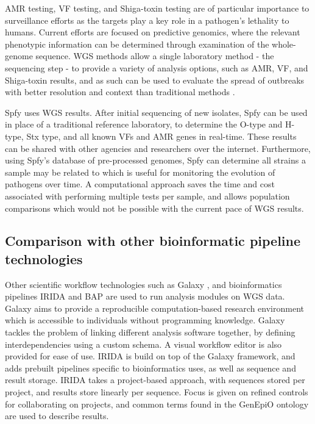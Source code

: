 \documentclass[a4,center,fleqn]{NAR}
\begin{document}
AMR testing, VF testing, and Shiga-toxin testing are of particular importance to surveillance efforts as the targets play a key role in a pathogen's lethality to humans.
Current efforts are focused on predictive genomics, where the relevant phenotypic information can be determined through examination of the whole-genome sequence.
WGS methods allow a single laboratory method - the sequencing step - to provide a variety of analysis options, such as AMR, VF, and Shiga-toxin results, and as such can be used to evaluate the spread of outbreaks with better resolution and context than traditional methods \cite{ronholm2016navigating}.

Spfy uses WGS results.
After initial sequencing of new isolates, Spfy can be used in place of a traditional reference laboratory, to determine the O-type and H-type, Stx type, and all known VFs and AMR genes in real-time.
These results can be shared with other agencies and researchers over the internet.
Furthermore, using Spfy's database of pre-processed genomes, Spfy can determine all strains a sample may be related to which is useful for monitoring the evolution of pathogens over time.
A computational approach saves the time and cost associated with performing multiple tests per sample, and allows population comparisons which would not be possible with the current pace of WGS results.

\subsection{Comparison with other bioinformatic pipeline technologies}

Other scientific workflow technologies such as Galaxy \cite{goecks2010galaxy}, and bioinformatics pipelines IRIDA and BAP are used to run analysis modules on WGS data.
Galaxy aims to provide a reproducible computation-based research environment which is accessible to individuals without programming knowledge. Galaxy tackles the problem of linking different analysis software together, by defining interdependencies using a custom schema. A visual workflow editor is also provided for ease of use.
IRIDA is build on top of the Galaxy framework, and adds prebuilt pipelines specific to bioinformatics uses, as well as sequence and result storage. IRIDA takes a project-based approach, with sequences stored per project, and results store linearly per sequence. Focus is given on refined controls for collaborating on projects, and common terms found in the GenEpiO ontology are used to describe results.
\end{document}
